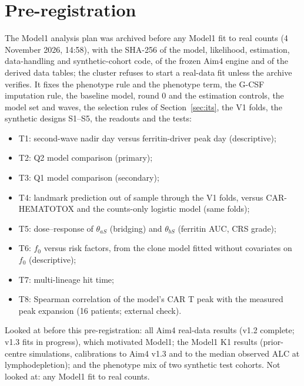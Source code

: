 \documentclass[11pt]{article}
\begin{document}
\section{Pre-registration}\label{sec:prereg}
The Model1 analysis plan was archived before any Model1 fit to real counts (4 November 2026, 14:58), with the SHA-256 of the model, likelihood, estimation, data-handling and synthetic-cohort code, of the frozen Aim4 engine and of the derived data tables; the cluster refuses to start a real-data fit unless the archive verifies. It fixes the phenotype rule and the phenotype term, the G-CSF imputation rule, the baseline model, round 0 and the estimation controls, the model set and waves, the selection rules of Section~\ref{sec:its}, the V1 folds, the synthetic designs S1--S5, the readouts and the tests:
\begin{itemize}
\item T1: second-wave nadir day versus ferritin-driver peak day (descriptive);
\item T2: Q2 model comparison (primary);
\item T3: Q1 model comparison (secondary);
\item T4: landmark prediction out of sample through the V1 folds, versus CAR-HEMATOTOX and the counts-only logistic model (same folds);
\item T5: dose--response of $\theta_{aS}$ (bridging) and $\theta_{bS}$ (ferritin AUC, CRS grade);
\item T6: $f_0$ versus risk factors, from the clone model fitted without covariates on $f_0$ (descriptive);
\item T7: multi-lineage hit time;
\item T8: Spearman correlation of the model's CAR T peak with the measured peak expansion (16 patients; external check).
\end{itemize}
Looked at before this pre-registration: all Aim4 real-data results (v1.2 complete; v1.3 fits in progress), which motivated Model1; the Model1 K1 results (prior-centre simulations, calibrations to Aim4 v1.3 and to the median observed ALC at lymphodepletion); and the phenotype mix of two synthetic test cohorts. Not looked at: any Model1 fit to real counts.
\end{document}
